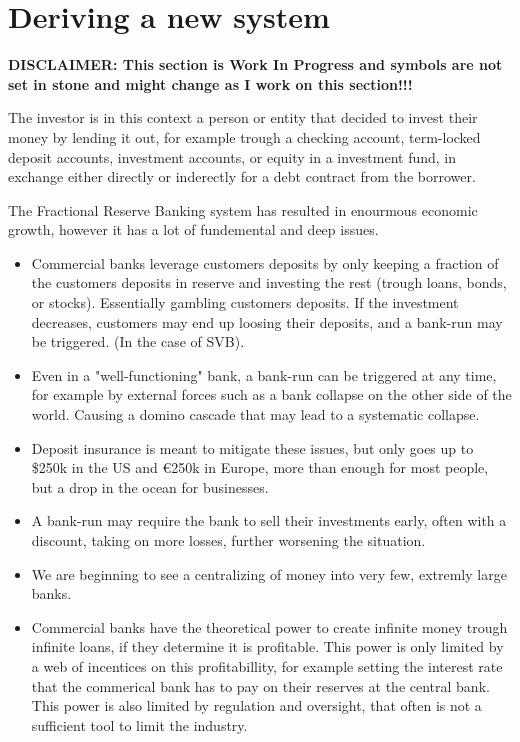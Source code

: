 \section{Deriving a new system}
\textbf{DISCLAIMER: This section is Work In Progress and symbols are not set in stone and might change as I work on this section!!!}

The investor is in this context a person or entity that decided to invest their money by lending it out, for example trough a checking account, term-locked deposit accounts, investment accounts, or equity in a investment fund, in exchange either directly or inderectly for a debt contract from the borrower.

The Fractional Reserve Banking system has resulted in enourmous economic growth, however it has a lot of fundemental and deep issues.
\begin{itemize}
    \item Commercial banks leverage customers deposits by only keeping a fraction of the customers deposits in reserve and investing the rest (trough loans, bonds, or stocks). Essentially gambling customers deposits. If the investment decreases, customers may end up loosing their deposits, and a bank-run may be triggered. (In the case of SVB). 
    \item Even in a "well-functioning" bank, a bank-run can be triggered at any time, for example by external forces such as a bank collapse on the other side of the world. Causing a domino cascade that may lead to a systematic collapse. 
    \item Deposit insurance is meant to mitigate these issues, but only goes up to \$250k in the US and €250k in Europe, more than enough for most people, but a drop in the ocean for businesses. 
    \item A bank-run may require the bank to sell their investments early, often with a discount, taking on more losses, further worsening the situation.
    \item We are beginning to see a centralizing of money into very few, extremly large banks.
    \item Commercial banks have the theoretical power to create infinite money trough infinite loans, if they determine it is profitable. This power is only limited by a web of incentices on this profitabillity, for example setting the interest rate that the commerical bank has to pay on their reserves at the central bank. This power is also limited by regulation and oversight, that often is not a sufficient tool to limit the industry. 

\end{itemize}
